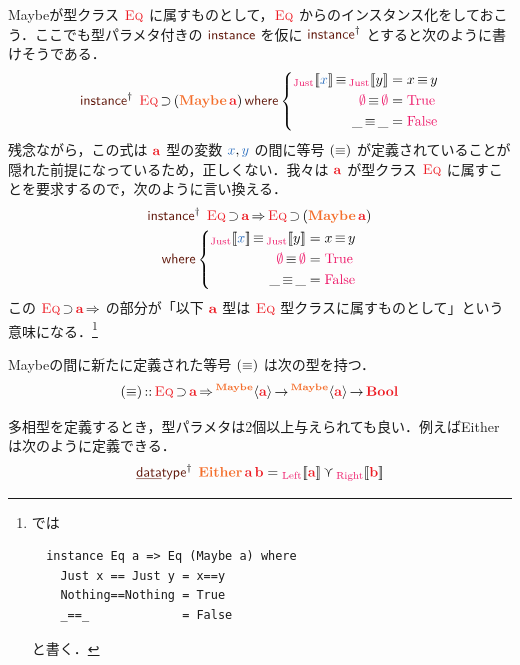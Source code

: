 \documentclass[a5paper,twoside,fleqn,draft]{jsbook}
\begin{document}
Maybeが型クラス $\hEq$ に属すものとして，$\hEq$ からのインスタンス化をしておこう．ここでも型パラメタ付きの $\mInstanceDecl$ を仮に $\mInstanceDeclPolymorphic$ とすると次のように書けそうである．
\begin{equation}
  \mInstanceDeclPolymorphic\;
  \hEq\hHasElementsOf{}(\hMaybe\,\hTypeName{a})
  \mWhere
  \left\{
  \begin{aligned}
    \hJustWith{\hVar{x}}\hIfEq\hJustWith{y}
    &=x\hIfEq y\\
    \hNothing\hIfEq\hNothing
    &=\hTrue\\
    \_\hIfEq\_
    &=\hFalse
  \end{aligned}
  \right.
\end{equation}
残念ながら，この式は $\hTypeName{a}$ 型の変数 $\hVar{x},\hVar{y}$ の間に等号 $(\operatorname{\equiv})$ が定義されていることが隠れた前提になっているため，正しくない．我々は $\hTypeName{a}$ が型クラス $\hEq$ に属すことを要求するので，次のように言い換える．
\begin{multline}
\mInstanceDeclPolymorphic\;
\hEq\hHasElementsOf\hTypeName{a}
\hAndThen
\hEq\hHasElementsOf{}(\hMaybe\,\hTypeName{a} )\\
\mWhere
\left\{
\begin{aligned}
\hJustWith{\hVar{x}}\hIfEq\hJustWith{y}&=x\hIfEq y\\
\hNothing\hIfEq\hNothing&=\hTrue\\
\_\hIfEq\_&=\hFalse
\end{aligned}
\right.
\end{multline}
この $\hEq\hHasElementsOf\hTypeName{a} \hAndThen$ の部分が「以下 $\hTypeName{a}$ 型は $\hEq$ 型クラスに属すものとして」という意味になる．\footnote{\haskell では
\begin{verbatim}
  instance Eq a => Eq (Maybe a) where
    Just x == Just y = x==y
    Nothing==Nothing = True
    _==_             = False
\end{verbatim}
と書く．}

Maybeの間に新たに定義された等号 $(\operatorname{\equiv})$ は次の型を持つ．
\begin{equation}
(\hIfEq)
\hIsTypeOf{}\hEq\hHasElementsOf\hTypeName{a}
\hAndThen\mProjEXP{\hMaybeConstruct{\hTypeName{a}}}{\mProjEXP{\hMaybeConstruct{\hTypeName{a}}}{\hBool}}
\end{equation}

\separator

多相型を定義するとき，型パラメタは2個以上与えられても良い．例えばEitherは次のように定義できる．
\begin{equation}
\mDataTypePolymorphic\;\hEither\,\hTypeName{a} \,\hTypeName{b}
=\hLeftWith{\hTypeName{a} }
\mValueOr
\hRightWith{\hTypeName{b} }
\end{equation}
\end{document}
